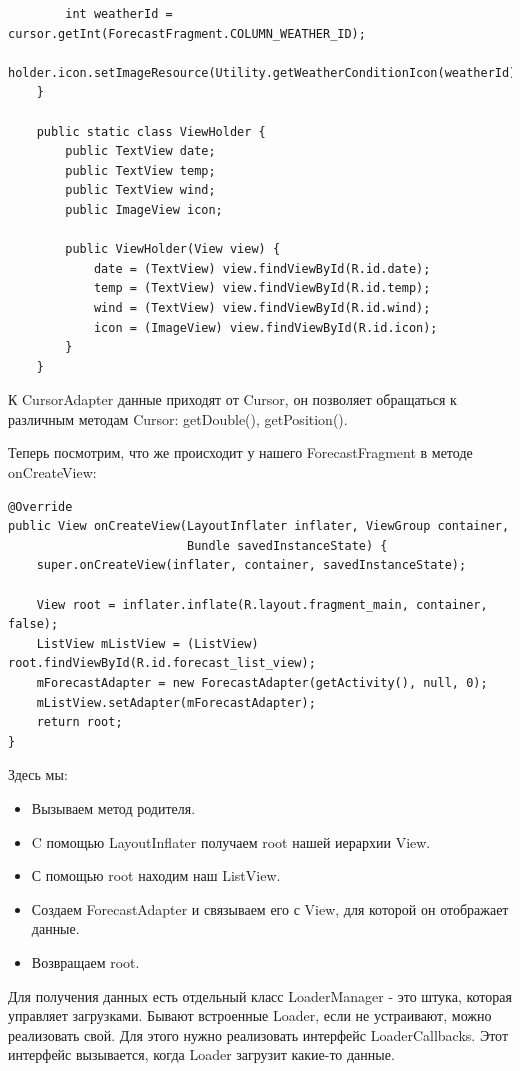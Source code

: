 \documentclass[12 pt]{article}
\begin{document}
\begin{itemize}
\begin{lstlisting}
        int weatherId = cursor.getInt(ForecastFragment.COLUMN_WEATHER_ID);
        holder.icon.setImageResource(Utility.getWeatherConditionIcon(weatherId));
    }

    public static class ViewHolder {
        public TextView date;
        public TextView temp;
        public TextView wind;
        public ImageView icon;

        public ViewHolder(View view) {
            date = (TextView) view.findViewById(R.id.date);
            temp = (TextView) view.findViewById(R.id.temp);
            wind = (TextView) view.findViewById(R.id.wind);
            icon = (ImageView) view.findViewById(R.id.icon);
        }
    }        
        \end{lstlisting}
    \end{itemize}
    
    К CursorAdapter данные приходят от Cursor, он позволяет обращаться к различным методам Cursor: getDouble(), getPosition().
	
	Теперь посмотрим, что же происходит у нашего ForecastFragment в методе onCreateView:
	\begin{lstlisting}
@Override
public View onCreateView(LayoutInflater inflater, ViewGroup container,
                         Bundle savedInstanceState) {
    super.onCreateView(inflater, container, savedInstanceState);

    View root = inflater.inflate(R.layout.fragment_main, container, false);
    ListView mListView = (ListView) root.findViewById(R.id.forecast_list_view);
    mForecastAdapter = new ForecastAdapter(getActivity(), null, 0);
    mListView.setAdapter(mForecastAdapter);
    return root;
}    
    \end{lstlisting}
	Здесь мы:
\begin{itemize}
\item Вызываем метод родителя.
\item C помощью LayoutInflater получаем root нашей иерархии View.
\item С помощью root находим наш ListView.
\item Создаем ForecastAdapter и связываем его с View, для которой он отображает данные.
\item Возвращаем root.
\end{itemize}

    Для получения данных есть отдельный класс LoaderManager - это штука, которая управляет загрузками. Бывают встроенные Loader, если не устраивают, можно реализовать свой. Для этого нужно реализовать интерфейс LoaderCallbacks. Этот интерфейс вызывается, когда Loader загрузит какие-то данные.
	
\end{document}
